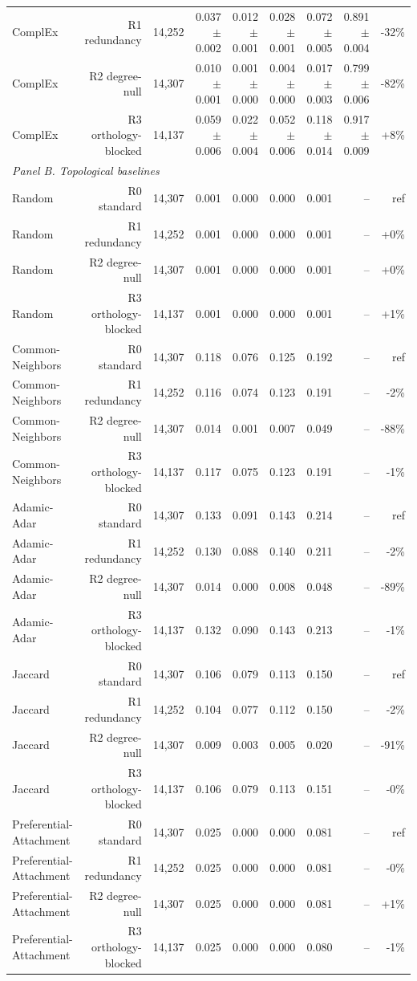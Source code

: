 \begin{table}[H]
\begin{tabular}{lrrrrrrrr}
ComplEx & R1 redundancy & 14,252 & 0.037 $\pm$ 0.002 & 0.012 $\pm$ 0.001 & 0.028 $\pm$ 0.001 & 0.072 $\pm$ 0.005 & 0.891 $\pm$ 0.004 & -32\% \\
ComplEx & R2 degree-null & 14,307 & 0.010 $\pm$ 0.001 & 0.001 $\pm$ 0.000 & 0.004 $\pm$ 0.000 & 0.017 $\pm$ 0.003 & 0.799 $\pm$ 0.006 & -82\% \\
ComplEx & R3 orthology-blocked & 14,137 & 0.059 $\pm$ 0.006 & 0.022 $\pm$ 0.004 & 0.052 $\pm$ 0.006 & 0.118 $\pm$ 0.014 & 0.917 $\pm$ 0.009 & +8\% \\
\multicolumn{9}{l}{\textit{Panel B. Topological baselines}} \\
Random & R0 standard & 14,307 & 0.001 & 0.000 & 0.000 & 0.001 & -- & ref \\
Random & R1 redundancy & 14,252 & 0.001 & 0.000 & 0.000 & 0.001 & -- & +0\% \\
Random & R2 degree-null & 14,307 & 0.001 & 0.000 & 0.000 & 0.001 & -- & +0\% \\
Random & R3 orthology-blocked & 14,137 & 0.001 & 0.000 & 0.000 & 0.001 & -- & +1\% \\
Common-Neighbors & R0 standard & 14,307 & 0.118 & 0.076 & 0.125 & 0.192 & -- & ref \\
Common-Neighbors & R1 redundancy & 14,252 & 0.116 & 0.074 & 0.123 & 0.191 & -- & -2\% \\
Common-Neighbors & R2 degree-null & 14,307 & 0.014 & 0.001 & 0.007 & 0.049 & -- & -88\% \\
Common-Neighbors & R3 orthology-blocked & 14,137 & 0.117 & 0.075 & 0.123 & 0.191 & -- & -1\% \\
Adamic-Adar & R0 standard & 14,307 & 0.133 & 0.091 & 0.143 & 0.214 & -- & ref \\
Adamic-Adar & R1 redundancy & 14,252 & 0.130 & 0.088 & 0.140 & 0.211 & -- & -2\% \\
Adamic-Adar & R2 degree-null & 14,307 & 0.014 & 0.000 & 0.008 & 0.048 & -- & -89\% \\
Adamic-Adar & R3 orthology-blocked & 14,137 & 0.132 & 0.090 & 0.143 & 0.213 & -- & -1\% \\
Jaccard & R0 standard & 14,307 & 0.106 & 0.079 & 0.113 & 0.150 & -- & ref \\
Jaccard & R1 redundancy & 14,252 & 0.104 & 0.077 & 0.112 & 0.150 & -- & -2\% \\
Jaccard & R2 degree-null & 14,307 & 0.009 & 0.003 & 0.005 & 0.020 & -- & -91\% \\
Jaccard & R3 orthology-blocked & 14,137 & 0.106 & 0.079 & 0.113 & 0.151 & -- & -0\% \\
Preferential-Attachment & R0 standard & 14,307 & 0.025 & 0.000 & 0.000 & 0.081 & -- & ref \\
Preferential-Attachment & R1 redundancy & 14,252 & 0.025 & 0.000 & 0.000 & 0.081 & -- & -0\% \\
Preferential-Attachment & R2 degree-null & 14,307 & 0.025 & 0.000 & 0.000 & 0.081 & -- & +1\% \\
Preferential-Attachment & R3 orthology-blocked & 14,137 & 0.025 & 0.000 & 0.000 & 0.080 & -- & -1\% \\
\bottomrule
\end{tabular}
\end{table}
